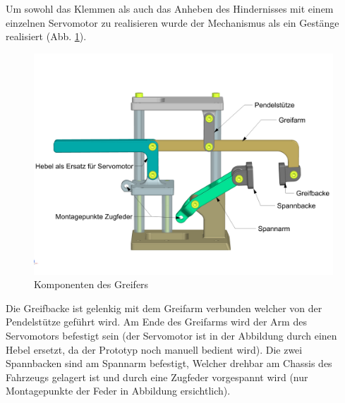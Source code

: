 \newpage

Um sowohl das Klemmen als auch das Anheben des Hindernisses mit einem einzelnen Servomotor zu realisieren wurde der Mechanismus als ein Gestänge realisiert (Abb. \ref{fig:gripper_components}).

\begin{figure}[H]
\centering
\includegraphics[width=1.0\linewidth]{assets/greifer-prototyp/Greifer_side_Komponentennamen.png} 
\caption{Komponenten des Greifers}
\label{fig:gripper_components}
\end{figure}

Die Greifbacke ist gelenkig mit dem Greifarm verbunden welcher von der Pendelstütze geführt wird. Am Ende des Greifarms wird der Arm des Servomotors befestigt sein (der Servomotor ist in der Abbildung durch einen Hebel ersetzt, da der Prototyp noch manuell bedient wird). Die zwei Spannbacken sind am Spannarm befestigt, Welcher drehbar am Chassis des Fahrzeugs gelagert ist und durch eine Zugfeder vorgespannt wird (nur Montagepunkte der Feder in Abbildung ersichtlich).

\newpage

